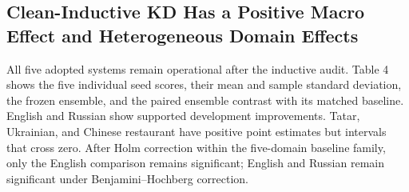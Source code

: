 \subsection{Clean-Inductive KD Has a Positive Macro Effect and
Heterogeneous Domain
Effects}\label{clean-inductive-kd-has-a-positive-macro-effect-and-heterogeneous-domain-effects}

All five adopted systems remain operational after the inductive audit.
Table 4 shows the five individual seed scores, their mean and sample
standard deviation, the frozen ensemble, and the paired ensemble
contrast with its matched baseline. English and Russian show supported
development improvements. Tatar, Ukrainian, and Chinese restaurant have
positive point estimates but intervals that cross zero. After Holm
correction within the five-domain baseline family, only the English
comparison remains significant; English and Russian remain significant
under Benjamini--Hochberg correction.

